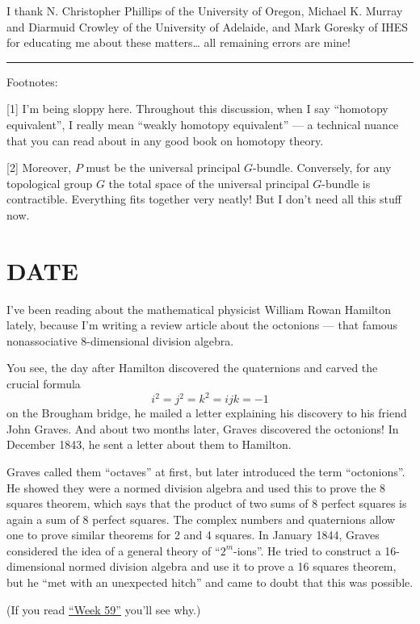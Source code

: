 \documentclass{article}
\begin{document}
I thank N. Christopher Phillips of the University of Oregon, Michael K.
Murray and Diarmuid Crowley of the University of Adelaide, and Mark
Goresky of IHES for educating me about these matters\ldots{} all
remaining errors are mine!

\begin{center}\rule{0.5\linewidth}{0.5pt}\end{center}

Footnotes:

{[}1{]} I'm being sloppy here. Throughout this discussion, when I say
``homotopy equivalent'', I really mean ``weakly homotopy equivalent''
--- a technical nuance that you can read about in any good book on
homotopy theory.

{[}2{]} Moreover, \(P\) must be the universal principal \(G\)-bundle.
Conversely, for any topological group \(G\) the total space of the
universal principal \(G\)-bundle is contractible. Everything fits
together very neatly! But I don't need all this stuff now.
\hypertarget{week152}{%
\section{DATE}\label{week152}}

I've been reading about the mathematical physicist William Rowan
Hamilton lately, because I'm writing a review article about the
octonions --- that famous nonassociative 8-dimensional division algebra.

You see, the day after Hamilton discovered the quaternions and carved
the crucial formula \[i^2=j^2=k^2=ijk=-1\] on the Brougham bridge, he
mailed a letter explaining his discovery to his friend John Graves. And
about two months later, Graves discovered the octonions! In December
1843, he sent a letter about them to Hamilton.

Graves called them ``octaves'' at first, but later introduced the term
``octonions''. He showed they were a normed division algebra and used
this to prove the 8 squares theorem, which says that the product of two
sums of 8 perfect squares is again a sum of 8 perfect squares. The
complex numbers and quaternions allow one to prove similar theorems for
2 and 4 squares. In January 1844, Graves considered the idea of a
general theory of ``\(2^m\)-ions''. He tried to construct a
16-dimensional normed division algebra and use it to prove a 16 squares
theorem, but he ``met with an unexpected hitch'' and came to doubt that
this was possible.

(If you read \protect\hyperlink{week59}{``Week 59''} you'll see why.)
\end{document}
